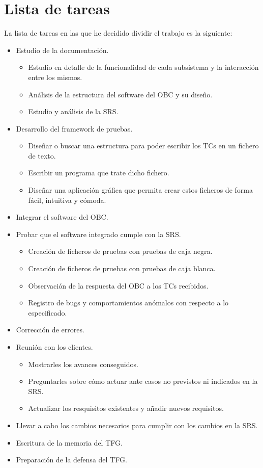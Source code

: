 
\section{Lista de tareas}
La lista de tareas en las que he decidido dividir el trabajo es la siguiente:
\begin{itemize}
\item Estudio de la documentación.
  \begin{itemize}
  \item Estudio en detalle de la funcionalidad de cada subsistema y la
    interacción entre los mismos.
  \item Análisis de la estructura del software del OBC y su diseño.
  \item Estudio y análisis de la SRS.
  \end{itemize}

\item Desarrollo del framework de pruebas.
  \begin{itemize}
  \item Diseñar o buscar una estructura para poder escribir los TCs en un
    fichero de texto.
  \item Escribir un programa que trate dicho fichero.
  \item Diseñar una aplicación gráfica que permita crear estos ficheros de
    forma fácil, intuitiva y cómoda.
  \end{itemize}

\item Integrar el software del OBC.

\item Probar que el software integrado cumple con la SRS.
  \begin{itemize}
  \item Creación de ficheros de pruebas con pruebas de caja negra.
  \item Creación de ficheros de pruebas con pruebas de caja blanca.
  \item Observación de la respuesta del OBC a los TCs recibidos.
  \item Registro de bugs y comportamientos anómalos con respecto a lo
    especificado.
  \end{itemize}

\item Corrección de errores.  
  
\item Reunión con los clientes.
  \begin{itemize}
  \item Mostrarles los avances conseguidos.
  \item Preguntarles sobre cómo actuar ante casos no previstos ni indicados
    en la SRS.
  \item Actualizar los resquisitos existentes y añadir nuevos requisitos.
  \end{itemize}

\item Llevar a cabo los cambios necesarios para cumplir con los cambios en la
  SRS.

\item Escritura de la memoria del TFG.
\item Preparación de la defensa del TFG.
  
\end{itemize}

